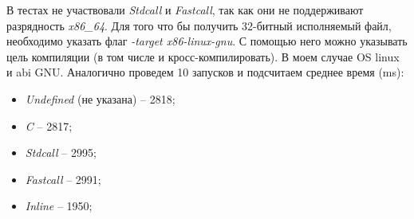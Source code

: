 В тестах не участвовали \textit{Stdcall} и \textit{Fastcall}, так как они не поддерживают разрядность \textit{x86\_64}. Для того что бы получить 32-битный исполняемый файл, необходимо указать флаг \textit{-target x86-linux-gnu}. С помощью него можно указывать цель компиляции (в том числе и кросс-компилировать). В моем случае OS linux и abi GNU. Аналогично проведем 10 запусков и подсчитаем среднее время (ms):
\begin{itemize}
    \item \textit{Undefined} (не указана) -- 2818;
    \item \textit{C} -- 2817;
    \item \textit{Stdcall} -- 2995;
    \item \textit{Fastcall} -- 2991;
    \item \textit{Inline} -- 1950;
\end{itemize}